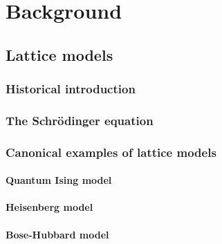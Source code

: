 
\chapter{Background}
\label{chapter2}

\ifpdf
    \graphicspath{{Chapter2/Figs/Raster/}{Chapter2/Figs/PDF/}{Chapter2/Figs/}}
\else
    \graphicspath{{Chapter2/Figs/Vector/}{Chapter2/Figs/}}
\fi

\section{Lattice models}
\label{sec:lattice-models}

\subsection{Historical introduction}
\label{subsec:latt-hist}

\subsection{The Schr{\"o}dinger equation}
\label{subsec:latt-qm}

\subsection{Canonical examples of lattice models}
\label{subsec:latt-examples}

\subsubsection{Quantum Ising model}
\subsubsection{Heisenberg model}
\subsubsection{Bose-Hubbard model}

\newpage
